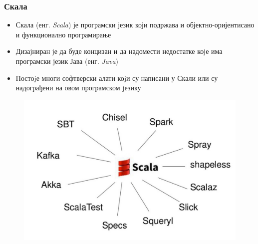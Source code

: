 \begin{frame}
\frametitle{Скала}

 \begin{itemize}
  \item Скала (енг. \textit{Scala}) је програмски језик који подржава и објектно-оријентисано и функционално програмирање
  \item Дизајниран је да буде концизан и да надомести недостатке које има програмски језик Јава (енг. \textit{Java})
  \item Постоjе многи софтверски алати коjи су написани у Скали или су надограђени на овом програмском jезику
  \end{itemize}

 \begin{figure}[H]
   \centering
       \includegraphics[scale=0.2]{slike/scalaDer.png}
  \end{figure}
\end{frame}
